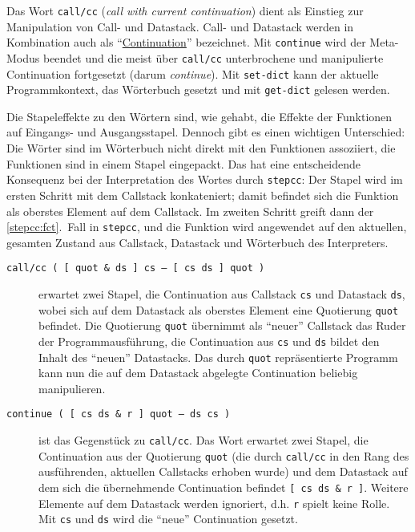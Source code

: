 Das Wort \verb|call/cc| (\emph{call with current continuation}) dient als Einstieg zur Manipulation von Call- und Datastack. Call- und Datastack werden in Kombination auch als "`\href{http://de.wikipedia.org/wiki/Continuation}{Continuation}"' bezeichnet. Mit \verb|continue| wird der Meta-Modus beendet und die meist über \verb|call/cc| unterbrochene und manipulierte Continuation fortgesetzt (darum \emph{continue}). Mit \verb|set-dict| kann der aktuelle Programmkontext, das Wörterbuch gesetzt und mit \verb|get-dict| gelesen werden.

Die Stapeleffekte zu den Wörtern sind, wie gehabt, die Effekte der Funktionen auf Eingangs- und Ausgangsstapel. Dennoch gibt es einen wichtigen Unterschied: Die Wörter sind im Wörterbuch nicht direkt mit den Funktionen assoziiert, die Funktionen sind in einem Stapel eingepackt.
Das hat eine entscheidende Konsequenz bei der Interpretation des Wortes durch \verb|stepcc|: Der Stapel wird im ersten Schritt mit dem Callstack konkateniert; damit befindet sich die Funktion als oberstes Element auf dem Callstack. Im zweiten Schritt greift dann der \ref{stepcc:fct}.~Fall in \verb|stepcc|, und die Funktion wird angewendet auf den aktuellen, gesamten Zustand aus Callstack, Datastack und Wörterbuch des Interpreters.

\begin{description}
\item[\texttt{call/cc ( [ quot \& ds ] cs -- [ cs ds ] quot )}] erwartet zwei Stapel, die Continuation aus Callstack \verb|cs| und Datastack \verb|ds|, wobei sich auf dem Datastack als oberstes Element eine Quotierung \verb|quot| befindet.
Die Quotierung \verb|quot| übernimmt als "`neuer"' Callstack das Ruder der Programmausführung, die Continuation aus \verb|cs| und \verb|ds| bildet den Inhalt des "`neuen"' Datastacks. Das durch \verb|quot| repräsentierte Programm kann nun die auf dem Datastack abgelegte Continuation beliebig manipulieren.
\end{description}

\begin{description}
\item[\texttt{continue ( [ cs ds \& r ] quot -- ds cs )}] ist das Gegenstück zu \verb|call/cc|. Das Wort erwartet zwei Stapel, die Continuation aus der Quotierung \verb|quot| (die durch \verb|call/cc| in den Rang des ausführenden, aktuellen Callstacks erhoben wurde) und dem Datastack auf dem sich die übernehmende Continuation befindet \verb|[ cs ds & r ]|. Weitere Elemente auf dem Datastack werden ignoriert, d.h. \verb|r| spielt keine Rolle. Mit \verb|cs| und \verb|ds| wird die "`neue"' Continuation gesetzt.
\end{description}

